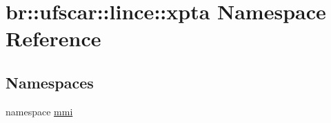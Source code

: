 \hypertarget{namespacebr_1_1ufscar_1_1lince_1_1xpta}{
\section{br::ufscar::lince::xpta Namespace Reference}
\label{namespacebr_1_1ufscar_1_1lince_1_1xpta}
}
\subsection*{Namespaces}
\begin{DoxyCompactItemize}
\item 
namespace \hyperlink{namespacebr_1_1ufscar_1_1lince_1_1xpta_1_1mmi}{mmi}
\end{DoxyCompactItemize}
